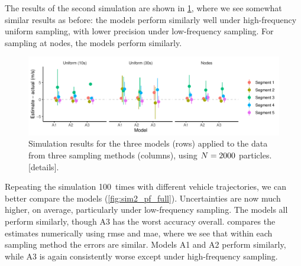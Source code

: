 The results of the second simulation are shown in \cref{fig:sim2_pf}, where we see somewhat similar results as before: the models perform similarly well under high-frequency uniform sampling, with lower precision under low-frequency sampling. For sampling at nodes, the models perform similarly.

\begin{knitrout}\small
{}\color{fgcolor}\begin{figure}
\includegraphics[width=\linewidth]{figure/sim2_pf-1} \caption[Simulation results for the three models (rows) applied to the data from three sampling methods (columns), using $\Np=2000$ particles]{Simulation results for the three models (rows) applied to the data from three sampling methods (columns), using $\Np=2000$ particles. [details].}\label{fig:sim2_pf}
\end{figure}


\end{knitrout}


Repeating the simulation 100~times with different vehicle trajectories, we can better compare the models (\cref{fig:sim2_pf_full}). Uncertainties are now much higher, on average, particularly under low-frequency sampling. The models all perform similarly, though A3 has the worst accuracy overall.  compares the estimates numerically using \gls{rmse} and \gls{mae}, where we see that within each sampling method the errors are similar. Models A1 and A2 perform similarly, while A3 is again consistently worse except under high-frequency sampling.


